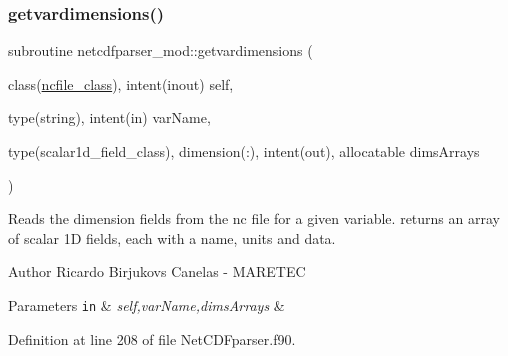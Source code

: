 \subsubsection{\texorpdfstring{getvardimensions()}{getvardimensions()}}
{\footnotesize\ttfamily subroutine netcdfparser\+\_\+mod\+::getvardimensions (\begin{DoxyParamCaption}\item[{class(\mbox{\hyperlink{structnetcdfparser__mod_1_1ncfile__class}{ncfile\+\_\+class}}), intent(inout)}]{self,  }\item[{type(string), intent(in)}]{var\+Name,  }\item[{type(scalar1d\+\_\+field\+\_\+class), dimension(\+:), intent(out), allocatable}]{dims\+Arrays }\end{DoxyParamCaption})\hspace{0.3cm}{\ttfamily [private]}}



Reads the dimension fields from the nc file for a given variable. returns an array of scalar 1D fields, each with a name, units and data. 

\begin{DoxyAuthor}{Author}
Ricardo Birjukovs Canelas -\/ M\+A\+R\+E\+T\+EC 
\end{DoxyAuthor}

\begin{DoxyParams}[1]{Parameters}
\mbox{\tt in}  & {\em self,var\+Name,dims\+Arrays} & \\
\hline
\end{DoxyParams}


Definition at line 208 of file Net\+C\+D\+Fparser.\+f90.


